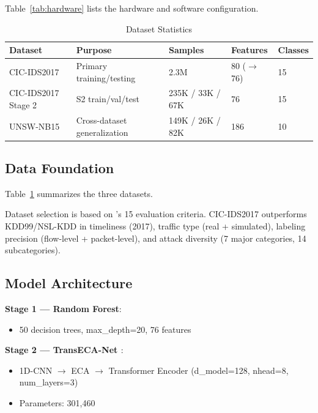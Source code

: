 \documentclass[sigconf]{acmart}
\begin{document}
\noindent Table~\ref{tab:hardware} lists the hardware and software configuration.


\begin{table}[!t]
\caption{Dataset Statistics}
\label{tab:datasets}
\begin{tabular}{p{3.5cm}p{4.5cm}p{4.0cm}p{2.0cm}p{2.0cm}}
\toprule
\textbf{Dataset} & \textbf{Purpose} & \textbf{Samples} & \textbf{Features} & \textbf{Classes} \\
\midrule
CIC-IDS2017 & Primary training/testing & 2.3M & 80 ($\to$76) & 15 \\
CIC-IDS2017 Stage 2 & S2 train/val/test & 235K / 33K / 67K & 76 & 15 \\
UNSW-NB15 & Cross-dataset generalization & 149K / 26K / 82K & 186 & 10 \\
\bottomrule
\end{tabular}
\end{table}

\subsection{Data Foundation} Table~\ref{tab:datasets} summarizes the three datasets.

Dataset selection is based on \cite{4}'s 15 evaluation criteria. CIC-IDS2017 \cite{1} outperforms KDD99/NSL-KDD in timeliness (2017), traffic type (real + simulated), labeling precision (flow-level + packet-level), and attack diversity (7 major categories, 14 subcategories).

\subsection{Model Architecture}
\textbf{Stage 1 --- Random Forest}:
\begin{itemize}
\item 50 decision trees, max\_depth=20, 76 features
\end{itemize}

\textbf{Stage 2 --- TransECA-Net \cite{2}}:
\begin{itemize}
\item 1D-CNN $\to$ ECA \cite{18} $\to$ Transformer Encoder (d\_model=128, nhead=8, num\_layers=3)
\item Parameters: 301,460
\end{itemize}
\end{document}
